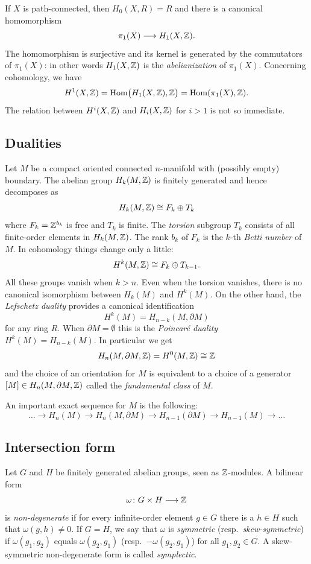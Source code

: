 If $X$ is path-connected, then $H_0(X,R)=R$ and there is a canonical homomorphism $$\pi_1(X) \longrightarrow H_1(X,\mathbb{Z}).$$
The homomorphism is surjective and its kernel is generated by the commutators of $\pi_1(X)$: in other words $H_1(X,\mathbb{Z})$ is the \emph{abelianization} of $\pi_1(X)$. Concerning cohomology, we have
$$H^1(X,\mathbb{Z}) = {\rm Hom}\big(H_1(X,\mathbb{Z}),\mathbb{Z}\big)  = {\rm Hom}(\pi_1(X), \mathbb{Z}).$$
The relation between $H^i(X,\mathbb{Z})$ and $H_i(X,\mathbb{Z})$ for $i>1$ is not so immediate.

\subsection{Dualities}
Let $M$ be a compact oriented connected $n$-manifold with (possibly empty) boundary. The abelian group $H_k(M,\mathbb{Z})$ is finitely generated and hence decomposes as  
$$H_k(M,\mathbb{Z}) \cong F_k \oplus T_k$$ 
where $F_k = \mathbb{Z}^{b_k}$ is free and $T_k$ is finite. The \emph{torsion} subgroup $T_k$ consists of all finite-order elements in $H_k(M,\mathbb{Z})$. The rank $b_k$ of $F_k$ is the $k$-th \emph{Betti number} of $M$. In cohomology things change only a little:
$$H^k(M,\mathbb{Z}) \cong F_k \oplus T_{k-1}.$$
All these groups vanish when $k>n$. Even when the torsion vanishes, there is no canonical isomorphism between $H_k(M)$ and $H^k(M)$. On the other hand,
the \emph{Lefschetz duality} provides a canonical identification  
$$H^k(M) = H_{n-k}(M,\partial M)$$
for any ring $R$. When $\partial M=\emptyset$ this is the \emph{Poincar\'e duality} $H^k(M) = H_{n-k}(M)$. In particular we get  
$$H_n(M, \partial M,\mathbb{Z}) = H^0(M,\mathbb{Z}) \cong \mathbb{Z}$$ 
and the choice of an orientation for $M$ is equivalent to a choice of a generator $[M] \in H_n(M,\partial M,\mathbb{Z})$ called the \emph{fundamental class} of $M$. 

An important exact sequence for $M$ is the following:
$$\ldots \longrightarrow H_n(M) \longrightarrow H_n(M,\partial M) \longrightarrow H_{n-1}(\partial M) \longrightarrow H_{n-1}(M) \longrightarrow \ldots$$

\subsection{Intersection form} \label{intersection:subsection}
Let $G$ and $H$ be finitely generated abelian groups, seen as $\mathbb{Z}$-modules. A bilinear form
$$\omega\colon G\times H \longrightarrow \mathbb{Z}$$
is \emph{non-degenerate} if for every infinite-order element $g\in G$ there is a  $h\in H$ such that $\omega(g,h)\neq 0$. If $G=H$, we say that $\omega$ is \emph{symmetric} (resp.~\emph{skew-symmetric}) if $\omega(g_1,g_2)$ equals $\omega(g_2,g_1)$ (resp.~$-\omega(g_2,g_1)$) for all $g_1,g_2\in G$. A skew-symmetric non-degenerate form is called \emph{symplectic}.  

